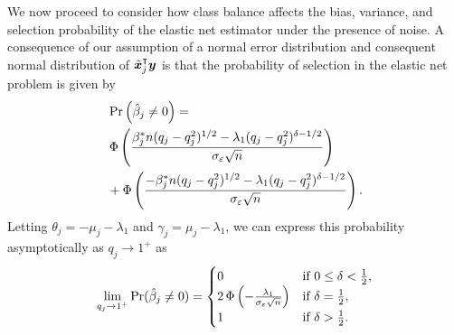 We now proceed to consider how class balance affects the bias, variance, and selection
probability of the elastic net estimator under the presence of noise. A consequence of our
assumption of a normal error distribution and consequent normal distribution of
\(\tilde{\boldsymbol{x}}_j^\intercal \boldsymbol{y}\) is that the probability of selection in the elastic net
problem is given by
\begin{align}
  \label{eq:selection-probability}
   & \Pr\left(\hat{\beta}_j \neq 0\right) =                                                                                                       \nonumber
  \\
   & \operatorname{\Phi} \left( \frac{\beta_j^*n (q_j-q_j^2)^{1/2} - \lambda_1(q_j-q_j^2)^{\delta - 1/2}}{\sigma_\varepsilon \sqrt{n}}\right)                \nonumber     \\
   & + \operatorname{\Phi} \left( \frac{-\beta_j^*n (q_j-q_j^2)^{1/2} - \lambda_1(q_j-q_j^2)^{\delta - 1/2}}{\sigma_\varepsilon \sqrt{n}}\right).
\end{align}
Letting \(\theta_j = -\mu_j - \lambda_1 \) and \(\gamma_j = \mu_j - \lambda_1\), we can
express this probability asymptotically as \(q_j \rightarrow 1^+\) as
\begin{equation}
  \label{eq:selection-probability-limit}
  \lim_{q_j \rightarrow 1^+} \Pr(\hat{\beta}_j \neq 0) =
  \begin{cases}
    0                                                                & \text{if } 0 \leq \delta < \frac{1}{2}, \\
    2\operatorname{\Phi}\left(-\frac{\lambda_1}{\sigma_\varepsilon \sqrt{n}}\right) & \text{if } \delta = \frac{1}{2},        \\
    1                                                                & \text{if } \delta > \frac{1}{2}.
  \end{cases}
\end{equation}


